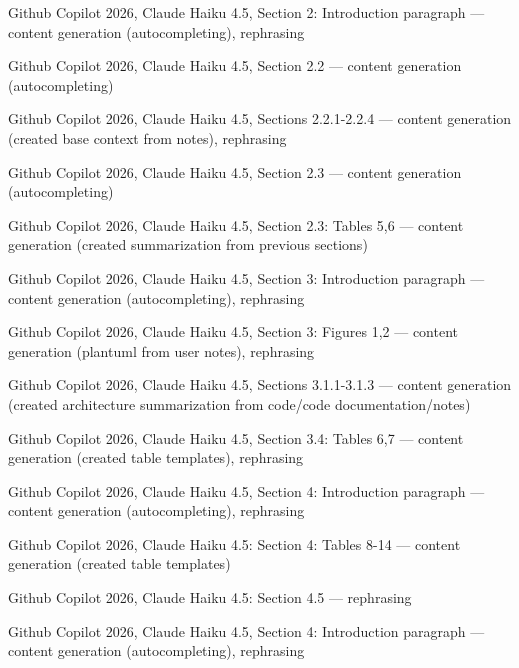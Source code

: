 \begin{trivlist}
\item Github Copilot 2026, Claude Haiku 4.5, Section 2: Introduction paragraph ---
    content generation (autocompleting), rephrasing

\item Github Copilot 2026, Claude Haiku 4.5, Section 2.2 ---
    content generation (autocompleting)

\item Github Copilot 2026, Claude Haiku 4.5, Sections 2.2.1-2.2.4 ---
    content generation (created base context from notes), rephrasing

\item Github Copilot 2026, Claude Haiku 4.5, Section 2.3 ---
    content generation (autocompleting)

\item Github Copilot 2026, Claude Haiku 4.5, Section 2.3: Tables 5,6 ---
    content generation (created summarization from previous sections)

\item Github Copilot 2026, Claude Haiku 4.5, Section 3: Introduction paragraph ---
    content generation (autocompleting), rephrasing

\item Github Copilot 2026, Claude Haiku 4.5, Section 3: Figures 1,2 ---
    content generation (plantuml from user notes), rephrasing

\item Github Copilot 2026, Claude Haiku 4.5, Sections 3.1.1-3.1.3 ---
    content generation (created architecture summarization from code/code documentation/notes)

\item Github Copilot 2026, Claude Haiku 4.5, Section 3.4: Tables 6,7 ---
    content generation (created table templates), rephrasing

\item Github Copilot 2026, Claude Haiku 4.5, Section 4: Introduction paragraph ---
    content generation (autocompleting), rephrasing

\item Github Copilot 2026, Claude Haiku 4.5: Section 4: Tables 8-14 ---
    content generation (created table templates)

\item Github Copilot 2026, Claude Haiku 4.5: Section 4.5 ---
    rephrasing

\item Github Copilot 2026, Claude Haiku 4.5, Section 4: Introduction paragraph ---
    content generation (autocompleting), rephrasing


\end{trivlist}
